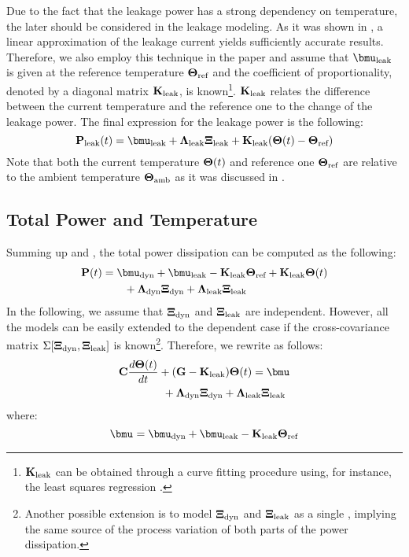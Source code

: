 Due to the fact that the leakage power has a strong dependency on temperature, the later should be considered in the leakage modeling. As it was shown in \cite{liu2007}, a linear approximation of the leakage current yields sufficiently accurate results. Therefore, we also employ this technique in the paper and assume that $\vmean{\leak}$ is given at the reference temperature $\mathbf{\Theta}_{\text{ref}}$ and the coefficient of proportionality, denoted by a diagonal matrix $\mathbf{K}_{\text{leak}}$, is known\footnote{$\mathbf{K}_{\text{leak}}$ can be obtained through a curve fitting procedure using, for instance, the least squares regression \cite{press2007}.}. $\mathbf{K}_{\text{leak}}$ relates the difference between the current temperature and the reference one to the change of the leakage power. The final expression for the leakage power is the following:
\begin{equation} \equlabel{leakage-power}
  \vpower_\leak(\time) = \vmean{\leak} + \ddev{\leak} \vnormal_\leak + \mratio_\leak(\vtemp(\time) - \vtemp_\refer)
\end{equation}
Note that both the current temperature $\mathbf{\Theta}(t)$ and reference one $\mathbf{\Theta}_{\text{ref}}$ are relative to the ambient temperature $\mathbf{\Theta}_{\text{amb}}$ as it was discussed in .

\subsection{Total Power and Temperature}
Summing up  and , the total power dissipation can be computed as the following:
\begin{align} \equlabel{total-power}
  \vpower(\time) & = \vmean{\dyn} + \vmean{\leak} - \mratio_\leak \vtemp_\refer + \mratio_\leak \vtemp(\time) \nonumber \\
  & { } \qquad + \ddev{\dyn} \vnormal_\dyn + \ddev{\leak} \vnormal_\leak
\end{align}
In the following, we assume that $\mathbf{\Xi}_{\text{dyn}}$ and $\mathbf{\Xi}_{\text{leak}}$ are independent. However, all the models can be easily extended to the dependent case if the cross-covariance matrix $\Sigma[\mathbf{\Xi}_{\text{dyn}}, \mathbf{\Xi}_{\text{leak}}]$ is known\footnote{Another possible extension is to model $\mathbf{\Xi}_{\text{dyn}}$ and $\mathbf{\Xi}_{\text{leak}}$ as a single \mrv, implying the same source of the process variation of both parts of the power dissipation.}. Therefore, we rewrite  as follows:
\begin{align}
  & \mcapacitance \frac{d\vtemp(\time)}{d\time} + (\mconductance - \mratio_\leak) \vtemp(\time) = \vmean{} \nonumber \\
  & { } \qquad \qquad + \ddev{\dyn} \vnormal_\dyn + \ddev{\leak} \vnormal_\leak  \equlabel{fourier-pv}
\end{align}
where:
\[
  \vmean{} = \vmean{\dyn} + \vmean{\leak} - \mratio_\leak \vtemp_\refer
\]

